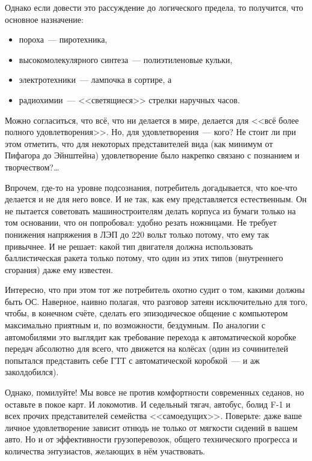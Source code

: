Однако если довести это рассуждение до логического предела, то получится, что основное назначение:

\begin{itemize}
	\item пороха~--- пиротехника,
	\item высокомолекулярного синтеза~--- полиэтиленовые кульки, 
	\item электротехники~--- лампочка в сортире, а 
	\item радиохимии~--- <<светящиеся>> стрелки наручных часов. 
\end{itemize}

Можно согласиться, что всё, что ни делается в мире, делается для <<всё более полного удовлетворения>>. Но, для удовлетворения~--- кого? Не стоит ли при этом отметить, что для некоторых представителей вида (как минимум от Пифагора до Эйнштейна) удовлетворение было накрепко связано с познанием и творчеством?\dots

Впрочем, где-то на уровне подсознания, потребитель догадывается, что кое-что делается и не для него вовсе. И не так, как ему представляется естественным. Он не пытается советовать машиностроителям делать корпуса из бумаги только на том основании, что он попробовал: удобно резать ножницами. Не требует понижения напряжения в ЛЭП до 220 вольт только потому, что ему так привычнее. И не решает: какой тип двигателя должна использовать баллистическая ракета только потому, что один из этих типов (внутреннего сгорания) даже ему известен.

Интересно, что при этом тот же потребитель охотно судит о том, какими должны быть ОС. Наверное, наивно полагая, что разговор затеян исключительно для того, чтобы, в конечном счёте, сделать его эпизодическое общение с компьютером максимально приятным и, по возможности, бездумным. По аналогии с автомобилями это выглядит как требование перехода к автоматической коробке передач абсолютно для всего, что движется на колёсах (один из сочинителей попытался представить себе ГТТ с автоматической коробкой~--- и аж заколдобился).

Однако, помилуйте! Мы вовсе не против комфортности современных седанов, но оставьте в покое карт. И локомотив. И седельный тягач, автобус, болид F-1 и всех прочих представителей семейства <<самоедущих>>. Поверьте: даже ваше личное удовлетворение зависит отнюдь не только от мягкости сидений в вашем авто. Но и от эффективности грузоперевозок, общего технического прогресса и количества энтузиастов, желающих в нём участвовать.

